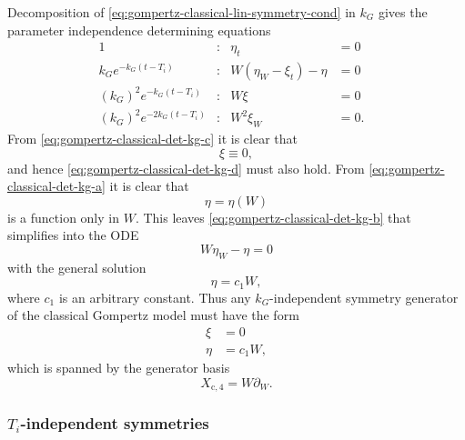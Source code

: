 Decomposition of \cref{eq:gompertz-classical-lin-symmetry-cond} in \(k_G\) gives the parameter independence determining equations
\begin{subequations}
  \begin{flalign}
    1 & : & \eta_t &= 0 &\label{eq:gompertz-classical-det-kg-a}\\
    k_G e^{-k_G (t - T_i)} & : & W \left(\eta_W - \xi_t\right) - \eta &= 0 &\label{eq:gompertz-classical-det-kg-b}\\
    (k_G)^2 e^{-k_G (t - T_i)} & : & W \xi &= 0 &\label{eq:gompertz-classical-det-kg-c}\\
    (k_G)^2 e^{-2k_G (t - T_i)} & : & W^2 \xi_W &= 0. &\label{eq:gompertz-classical-det-kg-d}
  \end{flalign}
\end{subequations}
From \cref{eq:gompertz-classical-det-kg-c} it is clear that
\begin{equation*}
  \xi \equiv 0,
\end{equation*}
and hence \cref{eq:gompertz-classical-det-kg-d} must also hold.
From \cref{eq:gompertz-classical-det-kg-a} it is clear that
\begin{equation*}
  \eta = \eta(W)
\end{equation*}
is a function only in \(W\).
This leaves \cref{eq:gompertz-classical-det-kg-b} that simplifies into the ODE
\begin{equation*}
  W \eta_W - \eta = 0
\end{equation*}
with the general solution
\begin{equation*}
  \eta = c_1 W,
\end{equation*}
where \(c_1\) is an arbitrary constant.
Thus any \(k_G\)-independent symmetry generator of the classical Gompertz model  must have the form
\begin{align*}
  \xi &= 0 \\
  \eta &= c_1 W,
\end{align*}
which is spanned by the generator basis
\begin{equation*}
  X_{\text{c},4} = W \partial_W.
\end{equation*}

\subsubsection{\texorpdfstring{\(T_i\)-independent symmetries}{Inflection time-independent symmetries}}

